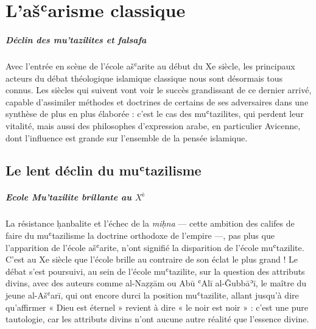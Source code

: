  \chapter{L’ašʿarisme classique}

 


\paragraph{Déclin des mu'tazilites et falsafa} Avec l'entrée en scène de l'école ašʿarite au début du Xe siècle, les
principaux acteurs du débat théologique islamique classique nous sont
désormais tous connus. Les siècles qui suivent vont voir le succès
grandissant de ce dernier arrivé, capable d'assimiler méthodes et
doctrines de certains de ses adversaires dans une synthèse de plus en
plus élaborée : c'est le cas des muʿtazilites, qui perdent leur
vitalité, mais aussi des philosophes d'expression arabe, en particulier
Avicenne, dont l'influence est grande sur l'ensemble de la pensée
islamique.


\hypertarget{le-lent-duxe9clin-du-muux2bftazilisme}{%
\section{Le lent déclin du
muʿtazilisme}\label{le-lent-duxe9clin-du-muux2bftazilisme}}


\paragraph{Ecole Mu'tazilite brillante au $X^è$} La résistance ḥanbalite et l'échec de la \emph{miḥna} --- cette ambition
des califes de faire du muʿtazilisme la doctrine orthodoxe de l'empire
---, pas plus que l'apparition de l'école ašʿarite, n'ont signifié la
disparition de l'école muʿtazilite. C'est au Xe siècle que l'école
brille au contraire de son éclat le plus grand ! Le débat s'est
poursuivi, au sein de l'école muʿtazilite, sur la question des attributs
divins, avec des auteurs comme al-Naẓẓām ou Abū ʿAlī al-Ǧubbāʾī, le
maître du jeune al-Ašʿarī, qui ont encore durci la position muʿtazilite,
allant jusqu'à dire qu'affirmer « Dieu est éternel » revient à dire « le
noir est noir » : c'est une pure tautologie, car les attributs divins
n'ont aucune autre réalité que l'essence divine.

